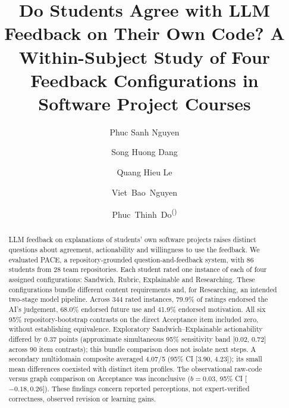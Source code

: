 \documentclass[runningheads]{llncs}
\begin{document}
\title{Do Students Agree with LLM Feedback on Their Own Code? A Within-Subject Study of Four Feedback Configurations in Software Project Courses}

\author{Phuc Sanh Nguyen \and
Song Huong Dang \and
Quang Hieu Le \and
Viet~Bao~Nguyen \and
Phuc~Thinh~Do\textsuperscript{(\Letter)}}

\maketitle
\begin{abstract}
LLM feedback on explanations of students' own software projects raises distinct questions about agreement, actionability and willingness to use the feedback. We evaluated PACE, a repository-grounded question-and-feedback system, with 86 students from 28 team repositories. Each student rated one instance of each of four assigned configurations: Sandwich, Rubric, Explainable and Researching. These configurations bundle different content requirements and, for Researching, an intended two-stage model pipeline. Across 344 rated instances, 79.9\% of ratings endorsed the AI's judgement, 68.0\% endorsed future use and 41.9\% endorsed motivation. All six 95\% repository-bootstrap contrasts on the direct Acceptance item included zero, without establishing equivalence. Exploratory Sandwich--Explainable actionability differed by 0.37 points (approximate simultaneous 95\% sensitivity band [0.02, 0.72] across 90 item contrasts); this bundle comparison does not isolate next steps. A secondary multidomain composite averaged 4.07/5 (95\% CI [3.90, 4.23]); its small mean differences coexisted with distinct item profiles. The observational raw-code versus graph comparison on Acceptance was inconclusive ($b=0.03$, 95\% CI [$-0.18,0.26$]). These findings concern reported perceptions, not expert-verified correctness, observed revision or learning gains.

\end{abstract}
\end{document}
